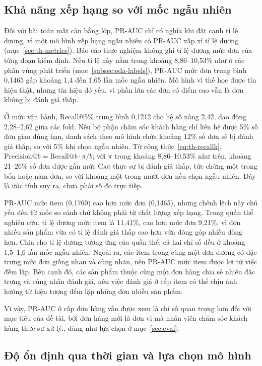 \documentclass[12pt,a4paper]{report}
\begin{document}
\subsection{Khả năng xếp hạng so với mốc ngẫu nhiên}\label{sec:analysis-ranking}

Đối với bài toán mất cân bằng lớp, PR-AUC chỉ có nghĩa khi đặt cạnh tỉ lệ dương, vì một mô hình xếp hạng ngẫu nhiên có PR-AUC xấp xỉ tỉ lệ dương (mục~\ref{sec:th-metrics}). Báo cáo thực nghiệm không ghi tỉ lệ dương mức đơn của từng đoạn kiểm định. Nếu tỉ lệ này nằm trong khoảng 8,86--10,53\% như ở các phân vùng phát triển (mục~\ref{subsec:eda-labels}), PR-AUC mức đơn trung bình 0,1465 gấp khoảng 1,4 đến 1,65 lần mốc ngẫu nhiên. Mô hình vì thế học được tín hiệu thật, nhưng tín hiệu đó yếu, vì phần lớn các đơn có điểm cao vẫn là đơn không bị đánh giá thấp.

Ở mức vận hành, Recall@5\% trung bình 0,1212 cho hệ số nâng 2,42, dao động 2,28--2,62 giữa các fold. Nếu bộ phận chăm sóc khách hàng chỉ liên hệ được 5\% số đơn giao đúng hạn, danh sách theo mô hình chứa khoảng 12\% số đơn sẽ bị đánh giá thấp, so với 5\% khi chọn ngẫu nhiên. Từ công thức~\eqref{eq:th-recallk}, $\mathrm{Precision@}b = \mathrm{Recall@}b \cdot \pi / b$; với $\pi$ trong khoảng 8,86--10,53\% như trên, khoảng 21--26\% số đơn được gắn mức \textsc{Cao} thực sự bị đánh giá thấp, tức chừng một trong bốn hoặc năm đơn, so với khoảng một trong mười đơn nếu chọn ngẫu nhiên. Đây là ước tính suy ra, chưa phải số đo trực tiếp.

PR-AUC mức item (0,1760) cao hơn mức đơn (0,1465), nhưng chênh lệch này chủ yếu đến từ mốc so sánh chứ không phải từ chất lượng xếp hạng. Trong quần thể nghiên cứu, tỉ lệ dương mức item là 11,41\%, cao hơn mức đơn 9,21\%, vì đơn nhiều sản phẩm vừa có tỉ lệ đánh giá thấp cao hơn vừa đóng góp nhiều dòng hơn. Chia cho tỉ lệ dương tương ứng của quần thể, cả hai chỉ số đều ở khoảng 1,5--1,6 lần mốc ngẫu nhiên. Ngoài ra, các item trong cùng một đơn dương có đặc trưng mức đơn giống nhau và cùng nhãn, nên PR-AUC mức item được lợi từ việc đếm lặp. Bên cạnh đó, các sản phẩm thuộc cùng một đơn hàng chia sẻ nhiều đặc trưng và cùng nhãn đánh giá, nên việc đánh giá ở cấp item có thể chịu ảnh hưởng từ hiện tượng đếm lặp những đơn nhiều sản phẩm. 

Vì vậy, PR-AUC ở cấp đơn hàng vẫn được xem là chỉ số quan trọng hơn đối với mục tiêu của đề tài, bởi đơn hàng mới là đơn vị mà nhân viên chăm sóc khách hàng thực sự xử lý., đúng như lựa chọn ở mục~\ref{sec:eval}.

\subsection{Độ ổn định qua thời gian và lựa chọn mô hình}\label{sec:analysis-stability}
\end{document}
